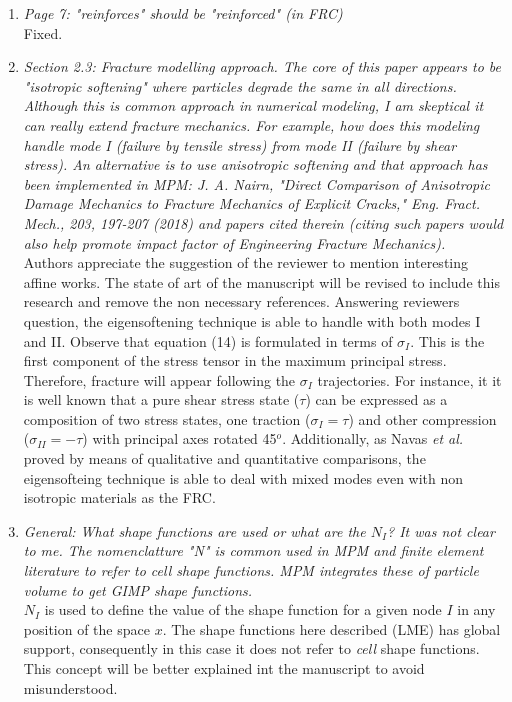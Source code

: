 \documentclass[12pt]{article}
\begin{document}
\begin{enumerate}
\item \textit{Page 7: "reinforces" should be "reinforced" (in FRC)}\\

Fixed.

\item \textit{Section 2.3: Fracture modelling approach. The core of this paper appears to be "isotropic softening" where particles degrade the same in all directions. Although this is common approach in numerical modeling, I am skeptical it can really extend fracture mechanics. For example, how does this modeling handle mode I (failure by tensile stress) from mode II (failure by shear stress). An alternative is to use anisotropic softening and that approach has been implemented in MPM: J. A. Nairn, "Direct Comparison of Anisotropic Damage Mechanics to Fracture Mechanics of Explicit Cracks," Eng. Fract. Mech., 203, 197-207 (2018) and papers cited therein (citing such papers would also help promote impact factor of Engineering Fracture Mechanics).}\\
 
Authors appreciate the suggestion of the reviewer to mention interesting affine works. The state of art of the manuscript will be revised to include this research and remove the non necessary references. Answering reviewer\textquotesingle s question, the eigensoftening technique is able to handle with both modes I and II. Observe that equation (14) is formulated in terms of $\sigma_{I}$. This is the first component of the stress tensor in the maximum principal stress. Therefore, fracture will appear following the $\sigma_I$ trajectories. For instance, it it is well known that a pure shear stress state ($\tau$) can be expressed as a composition of two stress states, one traction ($\sigma_{I} = \tau$) and other compression ($\sigma_{II} = -  \tau$) with principal axes rotated 45$^o$. Additionally, as  Navas {\it et al.}  \cite{Navas_2018b} proved by means of qualitative and quantitative comparisons, the eigensofteing technique is able to deal with mixed modes even with non isotropic materials as the FRC.
 
\item \textit{General: What shape functions are used or what are the $N_I$? It was not clear to me. The nomenclatture "N" is common used in MPM and finite element literature to refer to cell shape functions. MPM integrates these of particle volume to get GIMP shape functions.}\\

$N_I$ is used to define the value of the shape function for a given node $I$ in any position of the space $x$. The shape functions here described (LME) has global support, consequently in this case it does not refer to \textit{cell} shape functions. This concept will be better explained int the  manuscript to avoid misunderstood.
  

\end{enumerate}
\end{document}
